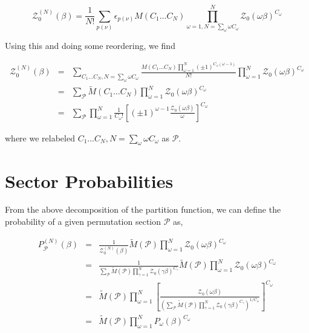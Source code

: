 \documentclass[aps,preprint,showpacs,superscriptaddress,groupedaddress]{revtex4}  %
\begin{document}
\begin{equation}
  \mathcal{Z}_{0}^{(N)}(\beta) = \frac{1}{N!} \sum_{p(\nu)} \epsilon_{p(\nu)} M(C_{1} \dots C_{N}) \prod_{\omega=1, N=\sum_{\omega}\omega C_{\omega}}^{N} \mathcal{Z}_{0}(\omega\beta)^{C_{\omega}}
\end{equation}

Using this and doing some reordering, we find

\begin{eqnarray}
  \mathcal{Z}_{0}^{(N)}(\beta) &=& \sum_{C_{1} \dots C_{N}, N=\sum_{\omega}\omega C_{\omega}} \frac{M(C_{1} \dots C_{N}) \prod_{\omega=1}^{N} (\pm 1)^{C_{\omega}(\omega-1)}}{N!} \prod_{\omega=1}^{N} \mathcal{Z}_{0}(\omega\beta)^{C_{\omega}} \\
                               &=& \sum_{\mathcal{P}} \tilde{M}(C_{1} \dots C_{N}) \prod_{\omega=1}^{N} \mathcal{Z}_{0}(\omega\beta)^{C_{\omega}} \\
                               &=& \sum_{\mathcal{P}} \prod_{\omega=1}^{N} \frac{1}{C_{\omega}!} [(\pm 1)^{\omega-1} \frac{\mathcal{Z}_{0}(\omega\beta)}{\omega}]^{C_{\omega}}
\end{eqnarray}

where we relabeled $C_{1} \dots C_{N}, N=\sum_{\omega}\omega C_{\omega}$ as $\mathcal{P}$.


\section{Sector Probabilities}

From the above decomposition of the partition function, we can define the probability of a given permutation section $\mathcal{P}$ as,

\begin{eqnarray}
  P_{\mathcal{P}}^{(N)}(\beta) &=& \frac{1}{\mathcal{Z}_{0}^{(N)}(\beta)} \tilde{M}(\mathcal{P}) \prod_{\omega=1}^{N} \mathcal{Z}_{0}(\omega\beta)^{C_{\omega}} \\
                               &=& \frac{1}{\sum_{\mathcal{P}} \tilde{M}(\mathcal{P}) \prod_{\gamma=1}^{N} \mathcal{Z}_{0}(\gamma\beta)^{C_{\gamma}}} \tilde{M}(\mathcal{P}) \prod_{\omega=1}^{N} \mathcal{Z}_{0}(\omega\beta)^{C_{\omega}} \\
                               &=& \tilde{M}(\mathcal{P}) \prod_{\omega=1}^{N} [\frac{\mathcal{Z}_{0}(\omega\beta)}{(\sum_{\mathcal{P}} \tilde{M}(\mathcal{P}) \prod_{\gamma=1}^{N} \mathcal{Z}_{0}(\gamma\beta)^{C_{\gamma}})^{1/C_{\omega}}}]^{C_{\omega}} \\
                               &=& \tilde{M}(\mathcal{P}) \prod_{\omega=1}^{N} P_{\omega}(\beta)^{C_{\omega}}
\end{eqnarray}
\end{document}
